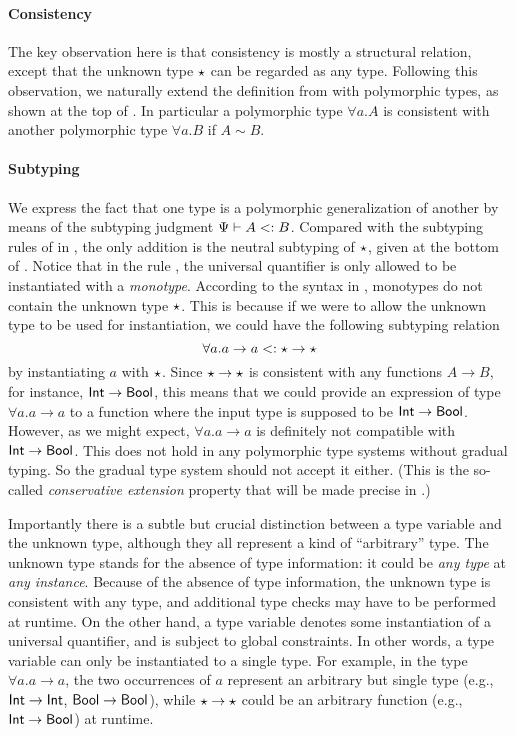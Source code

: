 \paragraph{Consistency}
The key observation here is that consistency is mostly a structural relation,
except that the unknown type $\star$ can be regarded as any type. Following
this observation, we naturally extend the definition from
 with polymorphic types, as shown at the top of
. In particular a polymorphic type $\forall a. A$
is consistent with another polymorphic type $\forall a. B$ if $A \sim B$.

\paragraph{Subtyping}

We express the fact that one type is a polymorphic generalization of another by
means of the subtyping judgment $\Psi \vdash A <: B$. Compared with the
subtyping rules of \citet{odersky1996putting} in
, the only addition is the neutral subtyping of
$\star$, given at the bottom of . Notice
that in the rule
, the universal quantifier is only allowed to be instantiated
with a \emph{monotype}. According to the syntax in ,
monotypes do not contain the unknown type $\star$. This is because if we were
to allow the unknown type to be used for instantiation, we could have the
following subtyping relation
\[
  \forall a . a \to a <: \star \to \star
\]
by instantiating $a$ with $\star$. Since $\star \to \star$ is
consistent with any functions $A \to B$, for instance, $\mathsf{Int} \to \mathsf{Bool}$, this
means that we could provide an expression of type $\forall a. a \to a$ to a
function where the input type is supposed to be $\mathsf{Int} \to \mathsf{Bool}$. However, as we
might expect, $\forall a. a \to a$ is definitely not compatible with $\mathsf{Int} \to
\mathsf{Bool}$. This does not hold in any polymorphic type systems without gradual
typing. So the gradual type system should not accept it either. (This is the
so-called \textit{conservative extension} property that will be made precise in
.)

Importantly there is a subtle but crucial distinction between a type variable
and the unknown type, although they all represent a kind of ``arbitrary'' type.
The unknown type stands for the absence of type information: it could be
\textit{any type} at \textit{any instance}. Because of the absence of type
information, the unknown type is consistent with any type, and additional
type checks may have to be performed at runtime. On the other hand, a type
variable denotes some instantiation of a universal quantifier, and is subject to
global constraints. In other words, a type variable can only be instantiated to
a single type. For example, in the type $\forall a. a \to a$, the two
occurrences of $a$ represent an arbitrary but single type (e.g., $\mathsf{Int} \to
\mathsf{Int}$, $\mathsf{Bool} \to \mathsf{Bool}$), while $\star \to \star$ could be an arbitrary
function (e.g., $\mathsf{Int} \to \mathsf{Bool}$) at runtime.

